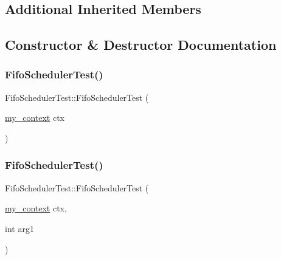 \subsection*{Additional Inherited Members}


\subsection{Constructor \& Destructor Documentation}
\mbox{\label{struct_fifo_scheduler_test_a1daf713197f381d478f82f15e8a47a54}} 
\subsubsection{\texorpdfstring{Fifo\+Scheduler\+Test()}{FifoSchedulerTest()}\hspace{0.1cm}{\footnotesize\ttfamily [1/7]}}
{\footnotesize\ttfamily Fifo\+Scheduler\+Test\+::\+Fifo\+Scheduler\+Test (\begin{DoxyParamCaption}\item[{\mbox{\hyperlink{classboost_1_1statechart_1_1event__processor_a99f1c6ec8419ec82f140c5c93c5eb8cd}{my\+\_\+context}}}]{ctx }\end{DoxyParamCaption})\hspace{0.3cm}{\ttfamily [inline]}}

\mbox{\label{struct_fifo_scheduler_test_aeae2265a239f2cf752b654904a3b4de7}} 
\subsubsection{\texorpdfstring{Fifo\+Scheduler\+Test()}{FifoSchedulerTest()}\hspace{0.1cm}{\footnotesize\ttfamily [2/7]}}
{\footnotesize\ttfamily Fifo\+Scheduler\+Test\+::\+Fifo\+Scheduler\+Test (\begin{DoxyParamCaption}\item[{\mbox{\hyperlink{classboost_1_1statechart_1_1event__processor_a99f1c6ec8419ec82f140c5c93c5eb8cd}{my\+\_\+context}}}]{ctx,  }\item[{int}]{arg1 }\end{DoxyParamCaption})\hspace{0.3cm}{\ttfamily [inline]}}

